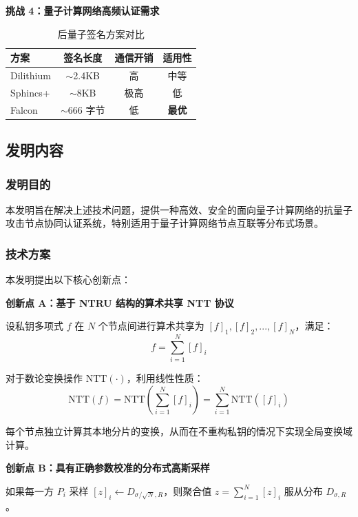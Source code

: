 \textbf{挑战 4：量子计算网络高频认证需求}

\begin{table}[H]
\centering
\caption{后量子签名方案对比}
\begin{tabular}{|l|c|c|c|}
\hline
\textbf{方案} & \textbf{签名长度} & \textbf{通信开销} & \textbf{适用性} \\
\hline
Dilithium & $\sim$2.4KB & 高 & 中等 \\
\hline
Sphincs+ & $\sim$8KB & 极高 & 低 \\
\hline
Falcon & $\sim$666 字节 & 低 & \textbf{最优} \\
\hline
\end{tabular}
\end{table}

\subsection{发明内容}

\subsubsection{发明目的}

本发明旨在解决上述技术问题，提供一种高效、安全的面向量子计算网络的抗量子攻击节点协同认证系统，特别适用于量子计算网络节点互联等分布式场景。

\subsubsection{技术方案}

本发明提出以下核心创新点：

\textbf{创新点 A：基于 NTRU 结构的算术共享 NTT 协议}

设私钥多项式 $f$ 在 $N$ 个节点间进行算术共享为 $[f]_1, [f]_2, ..., [f]_N$，满足：
$$f = \sum_{i=1}^{N} [f]_i$$

对于数论变换操作 $\text{NTT}(\cdot)$，利用线性性质：
$$\text{NTT}(f) = \text{NTT}\left(\sum_{i=1}^{N} [f]_i\right) = \sum_{i=1}^{N} \text{NTT}([f]_i)$$

每个节点独立计算其本地分片的变换，从而在不重构私钥的情况下实现全局变换域计算。

\textbf{创新点 B：具有正确参数校准的分布式高斯采样}

\begin{theorem}[高斯聚合]
如果每一方 $P_i$ 采样 $[z]_i \leftarrow D_{\sigma/\sqrt{N}, R}$，则聚合值 $z = \sum_{i=1}^{N} [z]_i$ 服从分布 $D_{\sigma, R}$。
\end{theorem}

